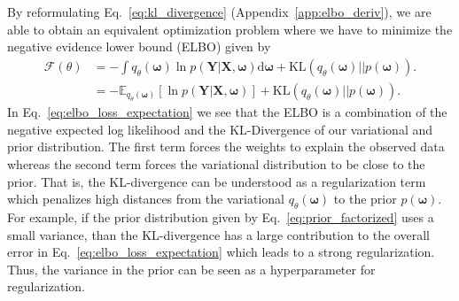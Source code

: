 \documentclass[runningheads]{llncs}
\begin{document}
By reformulating Eq.~\ref{eq:kl_divergence} (Appendix~\ref{app:elbo_deriv}), we are able to obtain an equivalent optimization problem where we have to minimize the negative evidence lower bound (ELBO) given by
\begin{align}
    \mathcal{F}(\theta) &= - \int q_\theta(\boldsymbol{\omega}) \ln p \left(\mathbf{Y} | \mathbf{X}, \boldsymbol{\omega}\right) \text{d}\boldsymbol{\omega} +
    \text{KL}\left(q_\theta(\boldsymbol{\omega}) || p(\boldsymbol{\omega}) \right). \label{eq:elbo} 
    \\
    &= - \mathbb{E}_{q_\theta(\boldsymbol{\omega})}\left[ \ln p \left(\mathbf{Y} | \mathbf{X}, \boldsymbol{\omega}\right)\right] +
    \text{KL}\left(q_\theta(\boldsymbol{\omega}) || p(\boldsymbol{\omega}) \right). \label{eq:elbo_loss_expectation}
\end{align}
In Eq.~\ref{eq:elbo_loss_expectation} we see that the ELBO is a combination of the negative expected log likelihood and the KL-Divergence of our variational and prior distribution.
The first term forces the weights to explain the observed data whereas the second term forces the variational distribution to be close to the prior. 
That is, the KL-divergence can be understood as a regularization term which penalizes high distances from the variational $q_\theta(\boldsymbol{\omega})$ to the prior $p(\boldsymbol{\omega})$.
For example, if the prior distribution given by Eq.~\ref{eq:prior_factorized} uses a small variance, than the KL-divergence has a large contribution to the overall error in Eq.~\ref{eq:elbo_loss_expectation} which leads to a strong regularization. 
Thus, the variance in the prior can be seen as a hyperparameter for regularization.
\end{document}

